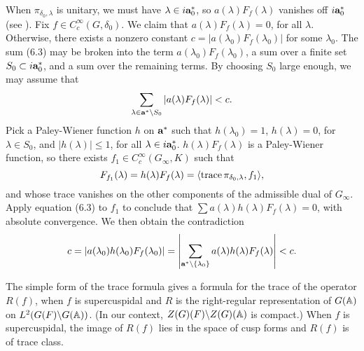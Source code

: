 When $\pi_{\delta_0,\lambda}$ is unitary, we must have
$\lambda\in i\aa_0^*$, so $a(\lambda)F_f(\lambda)$ vanishes off
$i\aa_0^*$ (see \cite{Kn,16.6}).
Fix $f\in C_c^\infty(G,\delta_0)$.
We claim that $a(\lambda) F_f(\lambda) = 0$, for all $\lambda$.
Otherwise, there exists a nonzero constant $c = |a(\lambda_0)F_f(\lambda_0)|$ for some
$\lambda_0$.  The sum (6.3)
may be broken into the term $a(\lambda_0)F_f(\lambda_0)$,
a sum over a finite set $S_0\subset i\aa_0^*$, and 
a sum over the remaining terms.  By choosing $S_0$ large enough,
we may assume that
$$\sum_{\lambda\in \aa^*\setminus S_0} |a(\lambda)F_f(\lambda)|< {c}.$$
Pick a Paley-Wiener function $h$ on $\aa^*$
such that $h(\lambda_0)=1$,
$h(\lambda)=0$, for $\lambda\in S_0$, and $|h(\lambda)|\le1$,
for all $\lambda\in i\aa_0^*$.  
$h(\lambda)F_f(\lambda)$ is a Paley-Wiener function,
so there exists $f_1\in C_c^\infty(G_\infty,K)$ such that
$$F_{f_1}(\lambda)=
	h(\lambda)F_f(\lambda) 
	= \langle\tr \pi_{\delta_0,\lambda},f_1\rangle,$$
and whose trace vanishes on the other components of the admissible
dual of $G_\infty$.  
Apply equation (6.3) to $f_1$ to conclude that
$\sum a(\lambda)h(\lambda)F_f(\lambda)=0$,
with absolute convergence.  We then obtain the contradiction
$$ c = |a(\lambda_0)h(\lambda_0)F_f(\lambda_0)|
	= \left|\sum_{\aa^*\setminus\{\lambda_0\}} 
	a(\lambda)h(\lambda)F_f(\lambda)\right| < c.$$


\bigskip
	
The simple form of the
trace formula gives a formula for the trace of the operator $R(f)$,
when $f$ is supercuspidal and $R$ is the right-regular representation
of $G(\Bbb A)$ on $L^2(G(F)\backslash G(\Bbb A))$.  (In our context,
$Z(G)(F)\backslash Z(G)(\Bbb A)$ is compact.) %
When $f$ is supercuspidal, the image of $R(f)$ lies in the space
of cusp forms and $R(f)$ is of trace class.  

